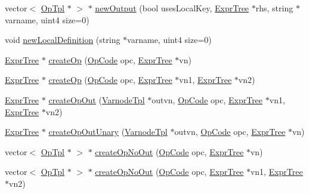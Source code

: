 \begin{DoxyCompactItemize}
\item 
vector$<$ \mbox{\hyperlink{class_op_tpl}{Op\+Tpl}} $\ast$ $>$ $\ast$ \mbox{\hyperlink{class_pcode_compile_ac43f27f167fc5fdc1bb3531346dc6797}{new\+Output}} (bool uses\+Local\+Key, \mbox{\hyperlink{class_expr_tree}{Expr\+Tree}} $\ast$rhs, string $\ast$varname, uint4 size=0)
\item 
void \mbox{\hyperlink{class_pcode_compile_a6c0c8bb263b71750d0772e6c599ed59b}{new\+Local\+Definition}} (string $\ast$varname, uint4 size=0)
\item 
\mbox{\hyperlink{class_expr_tree}{Expr\+Tree}} $\ast$ \mbox{\hyperlink{class_pcode_compile_ac653b660ec1b9cf01d6f8e84f916db99}{create\+Op}} (\mbox{\hyperlink{opcodes_8hh_abeb7dfb0e9e2b3114e240a405d046ea7}{Op\+Code}} opc, \mbox{\hyperlink{class_expr_tree}{Expr\+Tree}} $\ast$vn)
\item 
\mbox{\hyperlink{class_expr_tree}{Expr\+Tree}} $\ast$ \mbox{\hyperlink{class_pcode_compile_a7631ae95d4326f458cfea9825bd2f1af}{create\+Op}} (\mbox{\hyperlink{opcodes_8hh_abeb7dfb0e9e2b3114e240a405d046ea7}{Op\+Code}} opc, \mbox{\hyperlink{class_expr_tree}{Expr\+Tree}} $\ast$vn1, \mbox{\hyperlink{class_expr_tree}{Expr\+Tree}} $\ast$vn2)
\item 
\mbox{\hyperlink{class_expr_tree}{Expr\+Tree}} $\ast$ \mbox{\hyperlink{class_pcode_compile_ae446c23b3e9630fe67512e572dcfbb73}{create\+Op\+Out}} (\mbox{\hyperlink{class_varnode_tpl}{Varnode\+Tpl}} $\ast$outvn, \mbox{\hyperlink{opcodes_8hh_abeb7dfb0e9e2b3114e240a405d046ea7}{Op\+Code}} opc, \mbox{\hyperlink{class_expr_tree}{Expr\+Tree}} $\ast$vn1, \mbox{\hyperlink{class_expr_tree}{Expr\+Tree}} $\ast$vn2)
\item 
\mbox{\hyperlink{class_expr_tree}{Expr\+Tree}} $\ast$ \mbox{\hyperlink{class_pcode_compile_a65b6f2be619a063a46c3727a2de1215d}{create\+Op\+Out\+Unary}} (\mbox{\hyperlink{class_varnode_tpl}{Varnode\+Tpl}} $\ast$outvn, \mbox{\hyperlink{opcodes_8hh_abeb7dfb0e9e2b3114e240a405d046ea7}{Op\+Code}} opc, \mbox{\hyperlink{class_expr_tree}{Expr\+Tree}} $\ast$vn)
\item 
vector$<$ \mbox{\hyperlink{class_op_tpl}{Op\+Tpl}} $\ast$ $>$ $\ast$ \mbox{\hyperlink{class_pcode_compile_a0d195a0f919ee62221a5c01bbfbe713c}{create\+Op\+No\+Out}} (\mbox{\hyperlink{opcodes_8hh_abeb7dfb0e9e2b3114e240a405d046ea7}{Op\+Code}} opc, \mbox{\hyperlink{class_expr_tree}{Expr\+Tree}} $\ast$vn)
\item 
vector$<$ \mbox{\hyperlink{class_op_tpl}{Op\+Tpl}} $\ast$ $>$ $\ast$ \mbox{\hyperlink{class_pcode_compile_aa8af8519a707c8922ad4eda925a6500e}{create\+Op\+No\+Out}} (\mbox{\hyperlink{opcodes_8hh_abeb7dfb0e9e2b3114e240a405d046ea7}{Op\+Code}} opc, \mbox{\hyperlink{class_expr_tree}{Expr\+Tree}} $\ast$vn1, \mbox{\hyperlink{class_expr_tree}{Expr\+Tree}} $\ast$vn2)

\end{DoxyCompactItemize}
